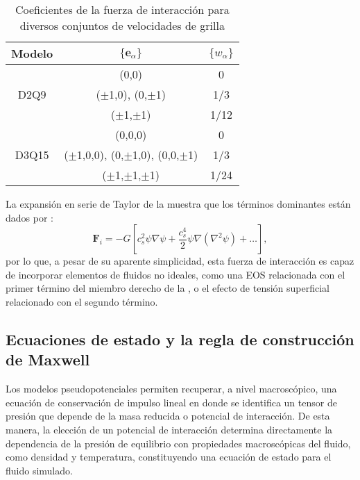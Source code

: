 \begin{table}[ht]
	\centering
    \begin{tabular}{c c c}
	    \toprule
        \bf Modelo & $\{\bm{e}_{\alpha}\}$ & $\{w_{\alpha}\}$  \\
        \midrule
        \multirow{3}{*}{D2Q9} & (0,0) & 0 \\
                              & ($\pm$1,0), (0,$\pm$1) & 1/3\\
                              & ($\pm$1,$\pm$1) & 1/12  \\                              
        \midrule
        \multirow{3}{*}{D3Q15} & (0,0,0) & 0 \\
                               & ($\pm$1,0,0), (0,$\pm$1,0), (0,0,$\pm$1) & 1/3   \\
                               & ($\pm$1,$\pm$1,$\pm$1) & 1/24  \\
        \bottomrule
	\end{tabular}
	\caption{Coeficientes de la fuerza de interacci\'on para diversos conjuntos de velocidades de grilla}
	\label{tab:coef_fza}
\end{table} 


La expansi\'on en serie de Taylor de la  muestra que los t\'erminos dominantes est\'an dados por \cite{shan_pressure_2008}:
\begin{equation}
	\bm{F}_i=-G\left[ c_s^2 \psi \nabla \psi + \dfrac{c_s^4}{2} \psi \nabla (\nabla^2 \psi)  + \ldots \right],
	\label{eq:f_int_taylor}
\end{equation}
por lo que, a pesar de su aparente simplicidad, esta fuerza de interacci\'on es capaz de incorporar elementos de fluidos no ideales, como una EOS relacionada con el primer t\'ermino del miembro derecho de la , o el efecto de tensi\'on superficial relacionado con el segundo t\'ermino.



\subsection{Ecuaciones de estado y la regla de construcci\'on de Maxwell}
\label{sec:EOS}

Los modelos pseudopotenciales permiten recuperar, a nivel macrosc\'opico, una ecuaci\'on de conservaci\'on de impulso lineal en donde se identifica un tensor de presi\'on que depende de la masa reducida o potencial de interacci\'on. De esta manera, la elecci\'on de un potencial de interacci\'on determina directamente la dependencia de la presi\'on de equilibrio con propiedades macrosc\'opicas del fluido, como densidad y temperatura, constituyendo una ecuaci\'on de estado para el fluido simulado. 


